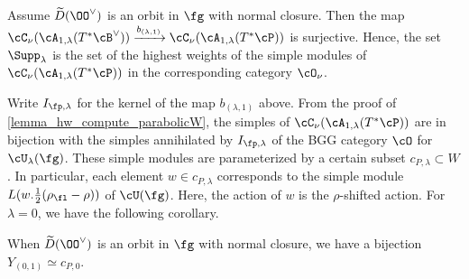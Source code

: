 \documentclass[12pt]{amsart}
\begin{document}
Assume $\widetilde{D}(\OO^\vee)$ is an orbit in $\fg$ with normal closure. Then the map $\cC_\nu(\cA_{1,\lambda}(T^*\cB^\vee))\xrightarrow{b_{(\lambda,1)}} \cC_\nu(\cA_{1,\lambda}(T^*\cP))$ is surjective. Hence, the set $\Supp_{\lambda}$ is the set of the highest weights of the simple modules of $\cC_\nu(\cA_{1,\lambda}(T^*\cP))$ in the corresponding category $\cO_\nu$. %

Write $I_{\fp,\lambda}$ for the kernel of the map $b_{(\lambda,1)}$ above. From the proof of \cref{lemma_hw_compute_parabolicW}, the simples of $\cC_\nu(\cA_{1,\lambda}(T^*\cP))$ are in bijection with the simples annihilated by $I_{\fp,\lambda}$ of the BGG category $\cO$ for $\cU_\lambda(\fg)$. These simple modules are parameterized by a certain subset $c_{P,\lambda}\subset W$. In particular, each element $w\in c_{P,\lambda}$ corresponds to the simple module $L(w.\frac{1}{2}(\rho_\fl-\rho))$ of $\cU(\fg)$. Here, the action of $w$ is the $\rho$-shifted action. For $\lambda= 0$, we have the following corollary.

\begin{cor} \label{combi bijection}
    When $\widetilde{D}(\OO^\vee)$ is an orbit in $\fg$ with normal closure, we have a bijection $Y_{(0, 1)}\simeq c_{P,0}$.
\end{cor}

\end{document}
